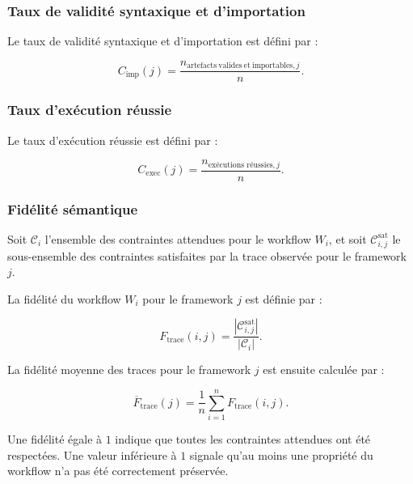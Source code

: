 \subsubsection{Taux de validité syntaxique et d'importation}

Le taux de validité syntaxique et d'importation est défini par :

\begin{equation}
C_{\mathrm{imp}}(j)
=
\frac{
    n_{\mathrm{artefacts\ valides\ et\ importables},j}
}{
    n
}.
\label{eq:taux-importation}
\end{equation}


\subsubsection{Taux d'exécution réussie}

Le taux d'exécution réussie est défini par :

\begin{equation}
C_{\mathrm{exec}}(j)
=
\frac{
    n_{\text{exécutions réussies},j}
}{
    n
}.
\label{eq:taux-execution}
\end{equation}


\subsubsection{Fidélité sémantique}

Soit $\mathcal{C}_{i}$ l'ensemble des contraintes attendues pour le
workflow $W_i$, et soit
$\mathcal{C}^{\mathrm{sat}}_{i,j}$ le sous-ensemble des contraintes
satisfaites par la trace observée pour le framework $j$.

La fidélité du workflow $W_i$ pour le framework $j$ est définie par :

\begin{equation}
F_{\mathrm{trace}}(i,j)
=
\frac{
    \left|\mathcal{C}^{\mathrm{sat}}_{i,j}\right|
}{
    \left|\mathcal{C}_{i}\right|
}.
\label{eq:fidelite-trace}
\end{equation}

La fidélité moyenne des traces pour le framework $j$ est ensuite
calculée par :

\begin{equation}
\overline{F}_{\mathrm{trace}}(j)
=
\frac{1}{n}
\sum_{i=1}^{n}
F_{\mathrm{trace}}(i,j).
\label{eq:fidelite-trace-moyenne}
\end{equation}

Une fidélité égale à $1$ indique que toutes les contraintes attendues
ont été respectées. Une valeur inférieure à $1$ signale qu'au moins une
propriété du workflow n'a pas été correctement préservée.


